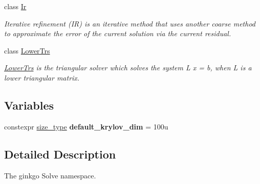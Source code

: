 \begin{DoxyCompactItemize}
class \hyperlink{classgko_1_1solver_1_1Ir}{Ir}
\begin{DoxyCompactList}\small\item\em Iterative refinement (IR) is an iterative method that uses another coarse method to approximate the error of the current solution via the current residual. \end{DoxyCompactList}\item 
class \hyperlink{classgko_1_1solver_1_1LowerTrs}{Lower\+Trs}
\begin{DoxyCompactList}\small\item\em \hyperlink{classgko_1_1solver_1_1LowerTrs}{Lower\+Trs} is the triangular solver which solves the system L x = b, when L is a lower triangular matrix. \end{DoxyCompactList}\end{DoxyCompactItemize}
\subsection*{Variables}
\begin{DoxyCompactItemize}
\item 
\mbox{\label{namespacegko_1_1solver_a39b458ab377c785ee54f5e4cbe7ab1a6}} 
constexpr \hyperlink{namespacegko_a6e5c95df0ae4e47aab2f604a22d98ee7}{size\+\_\+type} {\bfseries default\+\_\+krylov\+\_\+dim} = 100u
\end{DoxyCompactItemize}


\subsection{Detailed Description}
The ginkgo Solve namespace. 